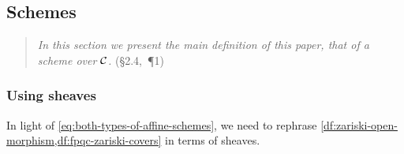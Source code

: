 
\subsection{Schemes} %
\label{sub:schemes}


    \begin{quotation}
        \emph{In this section we present the main definition of this paper, that of a \emph{scheme over $\mathcal{C}$}.} (\S2.4,~\P1)
    \end{quotation}

    \subsubsection{Using sheaves} %
    \label{ssub:using_sheaves}


        In light of \cref{eq:both-types-of-affine-schemes}, we need to rephrase \cref{df:zariski-open-morphism,df:fpqc-zariski-covers} in terms of sheaves.

